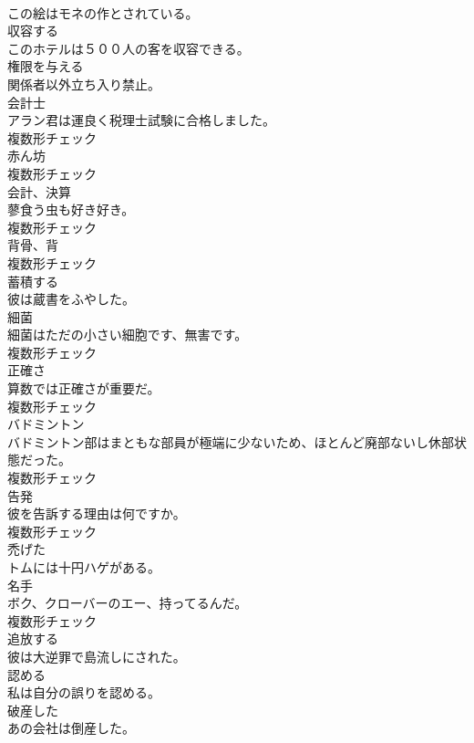 \documentclass[8pt]{extreport}
\begin{document}
\begin{CJK}{UTF8}{min}
\\	この絵はモネの作とされている。	
\\	[動詞]	収容する	
\\	このホテルは５００人の客を収容できる。	
\\	[動詞]	権限を与える	
\\	関係者以外立ち入り禁止。	
\\	[名詞]	会計士	
\\	アラン君は運良く税理士試験に合格しました。	
\\	複数形チェック
\\	[名詞]	赤ん坊	
\\	複数形チェック
\\	[名詞]	会計、決算	
\\	蓼食う虫も好き好き。	
\\	複数形チェック
\\	[名詞]	背骨、背	
\\	複数形チェック
\\	[動詞]	蓄積する	
\\	彼は蔵書をふやした。	
\\	[名詞]	細菌	
\\	細菌はただの小さい細胞です、無害です。	
\\	複数形チェック
\\	[名詞]	正確さ	
\\	算数では正確さが重要だ。	
\\	複数形チェック
\\	[名詞]	バドミントン	
\\	バドミントン部はまともな部員が極端に少ないため、ほとんど廃部ないし休部状態だった。	
\\	複数形チェック
\\	[名詞]	告発	
\\	彼を告訴する理由は何ですか。	
\\	複数形チェック
\\	[形容詞]	禿げた	
\\	トムには十円ハゲがある。	
\\	[名詞]	名手	
\\	ボク、クローバーのエー、持ってるんだ。	
\\	複数形チェック
\\	[動詞]	追放する	
\\	彼は大逆罪で島流しにされた。	
\\	[動詞]	認める	
\\	私は自分の誤りを認める。	
\\	[形容詞]	破産した	
\\	あの会社は倒産した。	

\end{CJK}
\end{document}
